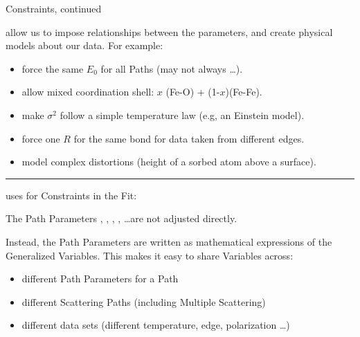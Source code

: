 \begin{slide}{Constraints, continued}
    
    {} allow us to impose relationships between the
    parameters, and create physical models about our data.  For example: 

    \begin{itemize} 
    \item force the same $E_0$ for all Paths (may not always \ldots).
      
    \item allow mixed coordination shell: $x$ (Fe-O) + (1-$x$)(Fe-Fe).
      
    \item make $\sigma^2$ follow a simple temperature law (e.g,  an
      Einstein model).
      
    \item force one $R$ for the same bond for data taken from different
      edges.

    \item model complex distortions (height of a sorbed atom above a surface).

    \end{itemize}
  
    \hrule \vmm \vmm
    
    {\ifeffit} uses {} for Constraints in
    the Fit:

    \vmm\vmm

    
    The {{Path Parameters}} , , ,
    , \ldots are not adjusted directly.
    
    \vmm Instead, the Path Parameters are written as mathematical
    expressions of the Generalized Variables.  This makes it easy to share
    Variables across:

    \begin{itemize}
    \item different Path Parameters for a Path
    \item different Scattering Paths (including Multiple Scattering)
    \item different data sets (different temperature, edge, polarization 
      \ldots)
    \end{itemize}
      


    

\vfill
\end{slide} 


